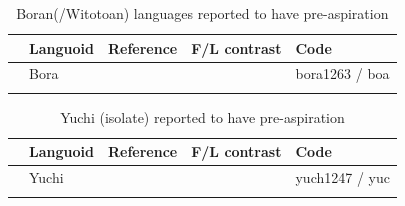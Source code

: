 \documentclass[output=paper]{langscibook}
\begin{document}
\begin{paperappendix}
\begin{table}
\begin{tabularx}{\textwidth}{@{}l@{}QQQl}
\lsptoprule
& Languoid & Reference & F/L contrast & Code\\
\midrule
  & Bora & \citet{Clayton2010} &  & bora1263 / boa\\
\lspbottomrule
\end{tabularx}
\caption{Boran(/Witotoan) languages reported to have pre-aspiration}
\label{tab:key:18}
\end{table}


\begin{table}
\begin{tabularx}{\textwidth}{@{}l@{}QQQl}
\lsptoprule
& Languoid & Reference & F/L contrast & Code\\
\midrule
  & Yuchi & \citet{Crawford1973} & \citet[174]{Crawford1973} & yuch1247 / yuc\\
\lspbottomrule
\end{tabularx}
\caption{Yuchi (isolate) reported to have pre-aspiration}
\label{tab:key:19}
\end{table}

\end{paperappendix}
\end{document}
